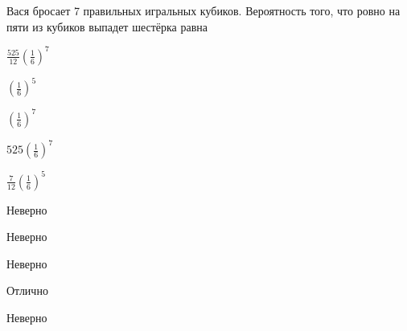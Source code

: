 
\begin{question}
Вася бросает 7 правильных игральных кубиков. Вероятность того, что ровно
на пяти из кубиков выпадет шестёрка равна
\begin{answerlist}
  \item \(\frac{525}{12}\left(\frac{1}{6}\right)^7\)
  \item \(\left(\frac{1}{6}\right)^5\)
  \item \(\left(\frac{1}{6}\right)^7\)
  \item \(525\left(\frac{1}{6}\right)^7\)
  \item \(\frac{7}{12}\left(\frac{1}{6}\right)^5\)
\end{answerlist}
\end{question}

\begin{solution}
\begin{answerlist}
  \item Неверно
  \item Неверно
  \item Неверно
  \item Отлично
  \item Неверно
\end{answerlist}
\end{solution}

